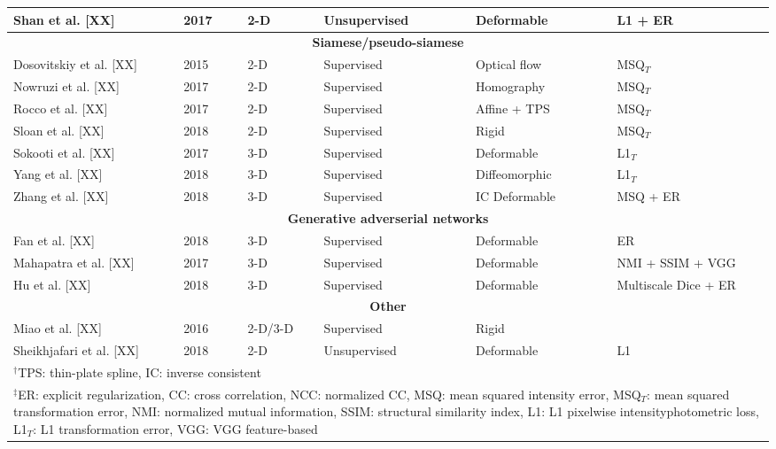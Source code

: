 \begin{table}[!htb]
\begin{tabular*}{\textwidth}{l@{\extracolsep{\fill}}l@{\extracolsep{\fill}}l@{\extracolsep{\fill}}l@{\extracolsep{\fill}}l@{\extracolsep{\fill}}l}
  Shan et al. [XX] & 2017 & 2-D & Unsupervised & Deformable & L1 + ER \\
\midrule
\multicolumn{6}{c}{\textbf{Siamese/pseudo-siamese}}
  \vspace{0.25cm} \\
  Dosovitskiy et al. [XX] & 2015 & 2-D & Supervised & Optical flow & MSQ$_T$ \\ %
  Nowruzi et al. [XX] & 2017 & 2-D & Supervised & Homography & MSQ$_T$ \\
  Rocco et al. [XX] & 2017 & 2-D & Supervised & Affine + TPS & MSQ$_T$ \\
  Sloan et al. [XX] & 2018 & 2-D & Supervised & Rigid & MSQ$_T$ \\  %
  Sokooti et al. [XX] & 2017 & 3-D & Supervised & Deformable & L1$_T$ \\
  Yang et al. [XX] & 2018 & 3-D & Supervised & Diffeomorphic & L1$_T$ \\  %
  Zhang et al. [XX] & 2018 & 3-D & Supervised & IC Deformable & MSQ + ER \\
\midrule
\multicolumn{6}{c}{\textbf{Generative adverserial networks}}
  \vspace{0.25cm} \\
  Fan et al. [XX] & 2018 & 3-D & Supervised & Deformable & ER \\
  Mahapatra et al. [XX] & 2017 & 3-D & Supervised & Deformable & NMI + SSIM + VGG \\
  Hu et al. [XX] & 2018 & 3-D & Supervised & Deformable & Multiscale Dice + ER \\
\midrule
\multicolumn{6}{c}{\textbf{Other}}
  \vspace{0.25cm} \\
  Miao et al. [XX] & 2016 & 2-D/3-D & Supervised & Rigid & {} \\
  Sheikhjafari et al. [XX] & 2018 & 2-D & Unsupervised & Deformable & L1 \\
\bottomrule
\multicolumn{6}{l}{
  \begin{minipage}[t]{0.9\columnwidth}%
    \footnotesize{$^\dagger$TPS: thin-plate spline, IC: inverse consistent}
  \end{minipage}
  } \\
\multicolumn{6}{l}{
  \begin{minipage}[t]{0.92\columnwidth}%
    \footnotesize{$^\ddagger$ER:  explicit regularization,
      CC: cross correlation, NCC: normalized CC, MSQ: mean squared intensity error,
      MSQ$_T$: mean squared transformation error,
      NMI:  normalized mutual information, SSIM:  structural similarity index,
      L1:  L1 pixelwise intensityphotometric loss,
      L1$_T$: L1 transformation error, VGG: VGG feature-based}
  \end{minipage}
  }
\end{tabular*}
\end{table}

